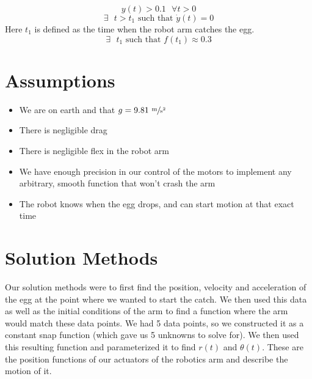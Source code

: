 \documentclass[nofoot,pdf-a,balance,colorlinks,upint,subscriptcorrection,varvw,mathalfa=cal=boondoxo]{asmeconf}
\begin{document}
    \begin{equation}\label{condition_6}
        {y}\left(t\right) > 0.1 \textrm{    } \forall t > 0
    \end{equation}
    \begin{equation}\label{condition_7}
        \exists \textrm{ }t > t_1 \textrm{      such that  }\dot{y}\left(t\right) = 0 
    \end{equation}
    Here $t_1$ is defined as the time when the robot arm catches the egg.
    \begin{equation}\label{condition_8}
        \exists\textrm{  } t_1 \textrm{      such that  } f(t_1) \approx 0.3
    \end{equation}
	
		\section*{Assumptions}
	
	\begin{itemize}
        \item We are on earth and that $g = 9.81 \textrm{ }\sfrac{\textrm{m}}{\textrm{s}^2}$
		\item There is negligible drag
		\item There is negligible flex in the robot arm
        \item We have enough precision in our control of the motors to implement any arbitrary, smooth function that won't crash the arm
		\item The robot knows when the egg drops, and can start motion at that exact time
	\end{itemize}

	\section*{Solution Methods}
	
		Our solution methods were to first find the position, velocity and acceleration of the egg at the point where we wanted to start the catch. We then used this data as well as the initial conditions of the arm to find a function where the arm would match these data points. We had 5 data points, so we constructed it as a constant snap function (which gave us 5 unknowns to solve for). We then used this resulting function and parameterized it to find $r\left(t\right)$ and $\theta\left(t\right)$. These are the position functions of our actuators of the robotics arm and describe the motion of it.\newline
\end{document}
